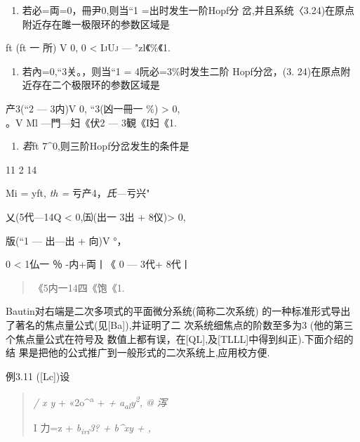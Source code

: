 \documentclass{article}
\begin{document}
\begin{enumerate}
\def\labelenumi{(\arabic{enumi})}
\item
  若必=両=0，冊尹0,则当``1 =出时发生一阶Hopf分
  岔,并且系统〈3.24)在原点附近存在雎一极限环的参数区域是
\end{enumerate}

ft (ft 一 所) V 0, 0 \textless{} \textsc{IjUj} ---
"zl《\textbar{}\%\textbar{}《1.

\begin{enumerate}
\def\labelenumi{(\arabic{enumi})}
\setcounter{enumi}{1}
\item
  若內=0,``3关。，则当``1 = 4阮必=3\%时发生二阶 Hopf分岔，(3.
  24)在原点附近存在二个极限环的参数区域是
\end{enumerate}

产3(``2 --- 3内)V 0, ``3(凶一冊一 \%) \textgreater{} 0,\\
。V Ml ---門---妇《伏2 --- 3観《I妇《1.

\begin{enumerate}
\def\labelenumi{(\arabic{enumi})}
\setcounter{enumi}{2}
\item
  \emph{若}ft 7\^{}0,则三阶Hopf分岔发生的条件是
\end{enumerate}

11 2 14

Mi = yft, \emph{th =} 亏产4，\emph{氏---}亏兴"

乂(5代---14Q \textless{} 0,㈤(出一 3出 + 8仪)\textgreater{} 0,

版(``1 --- 出---出 + 向)V °，

0 \textless{} 1仏一 ％ -内+両丨《 0 --- 3代+ 8代丨

\begin{quote}
《\textbar{}5内一14四\textbar{}《\textbar{}饱\textbar{}《1.
\end{quote}

Bautin对右端是二次多项式的平面微分系统(简称二次系统)
的一种标准形式导出了著名的焦点量公式(见{[}Ba{]}),并证明了二
次系统细焦点的阶数至多为3 (他的第三个焦点量公式在符号及
数值上都有误，在{[}QL{]},及{[}TLLL{]}中得到纠正).下面介绍的结
果是把他的公式推广到一般形式的二次系统上,应用校方便.

例3.11 ({[}Lc{]})设

\begin{quote}
\emph{/ x y} + «2o\^{}\textsuperscript{a} + \emph{+
a\textsubscript{al}y\textsuperscript{2}, @ 泻}

I 力=z + \emph{b\textsubscript{iri}3? + b\^{}xy + ,}
\end{quote}
\end{document}
